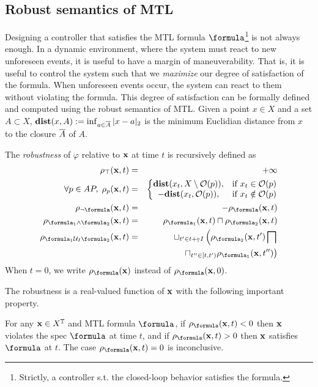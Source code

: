 \subsection{Robust semantics of MTL}
\label{sec:rob sem}
Designing a controller that satisfies the MTL formula $\formula$\footnote{Strictly, a controller s.t. the closed-loop behavior satisfies the formula.} is not always enough.
In a dynamic environment, where the system must react to new unforeseen events, it is useful to have a margin of maneuverability.
That is, it is useful to control the system such that we \textit{maximize} our degree of satisfaction of the formula.
When unforeseen events occur, the system can react to them without violating the formula.
This degree of satisfaction can be formally defined and computed using the robust semantics of MTL.
Given a point $x \in X$ and a set $A \subset X$, $\mathbf{dist}(x,A) := \inf_{a \in \overline{A}}|x-a|_2$ is the minimum Euclidian distance from $x$  to the closure $\overline{A}$ of $A$.
\begin{definition}
	\label{def:robustness estimate}
	The \emph{robustness} of $\varphi$ relative to $\mathbf{x}$ at time $t$ is recursively defined as 
	\begin{eqnarray*}
		\label{eq:robustness estimate}
		\rob_{\top} (\sstraj,t) &=& +\infty
		\\
		\forall p \in AP, \;  \rob_{p} (\sstraj,t) &=& \left \lbrace \begin{matrix}
			\dist(\stPt_t, \stSet \setminus \Oc(p)), &\text{if } \stPt_t \in \Oc(p)
			\\
			-\dist(x_t, \Oc(p)), &\text{if } \stPt_t \notin \Oc(p)						
		\end{matrix} \right.
		\\
		\rob_{\lnot \formula} (\sstraj,t) &=& - \rob_{\formula} (\sstraj,t)
		\\
		\rob_{ \formula_1 \land \formula_2} (\sstraj,t) &=& \rob_{\formula_1} (\sstraj,t) \sqcap \rob_{\formula_2} (\sstraj,t) 
		\\
		\rob_{ \formula_1 \until_I \formula_2} (\sstraj,t) &=& \sqcup_{t' \in t+_{\TDom}I} \left(\rob_{\formula_2} (\sstraj,t') \bigsqcap \right.
		\\
		&& \left. \sqcap_{t'' \in [t,t')}   \rob_{\formula_1} (\sstraj,t'') \right) 
	\end{eqnarray*}
	When $t=0$, we write $\robf(\sstraj)$ instead of $\robf(\sstraj,0)$.
\end{definition}
The robustness is a real-valued function of $\mathbf{x}$ with the following important property.
\begin{theorem} \cite{FainekosP09tcs}
	\label{thm:rob objective}
	For any $\mathbf{x} \in X^{\mathbb{T}}$ and MTL formula $\formula$, 
	if $\robf(\sstraj,t) <0$ then $\mathbf{x}$ violates the spec $\formula$ at time $t$, and if $\robf(\sstraj,t) > 0$ then $\mathbf{x}$ satisfies $\formula$ at $t$. 
	The case $\robf(\sstraj,t) =0$ is inconclusive.
\end{theorem} 

